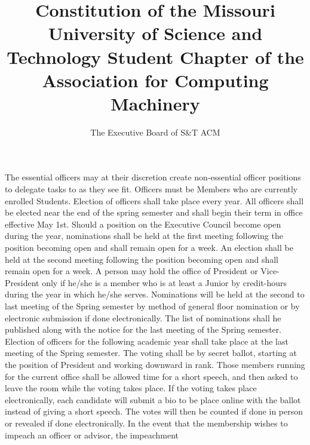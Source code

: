 \documentclass[11pt,a4paper,notitlepage]{article}
\author{The Executive Board of S\&T ACM}
\title{Constitution of the Missouri University of Science and Technology Student Chapter of the Association for Computing Machinery}
\begin{document}
\maketitle


\pagebreak
\tableofcontents

\iffalse
The essential officers may at their discretion create non-essential officer
positions to delegate tasks to as they see fit. Officers must be Members who are
currently enrolled Students. Election of officers shall take place every year.
All officers shall be elected near the end of the spring semester and shall
begin their term in office effective May 1st. Should a position on the Executive
Council become open during the year, nominations shall be held at the first
meeting following the position becoming open and shall remain open for a week.
An election shall be held at the second meeting following the position becoming
open and shall remain open for a week. A person may hold the office of President
or Vice-President only if he/she is a member who is at least a Junior by
credit-hours during the year in which he/she serves. Nominations will be held at
the second to last meeting of the Spring semester by method of general floor
nomination or by electronic submission if done electronically. The list of
nominations shall he published along with the notice for the last meeting of the
Spring semester. Election of officers for the following academic year shall take
place at the last meeting of the Spring semester. The voting shall be by secret
ballot, starting at the position of President and working downward in rank.
Those members running for the current office shall be allowed time for a short
speech, and then asked to leave the room while the voting takes place. If the
voting takes place electronically, each candidate will submit a bio to be place
online with the ballot instead of giving a short speech. The votes will then be
counted if done in person or revealed if done electronically. In the event that
the membership wishes to impeach an officer or advisor, the impeachment
\end{document}
